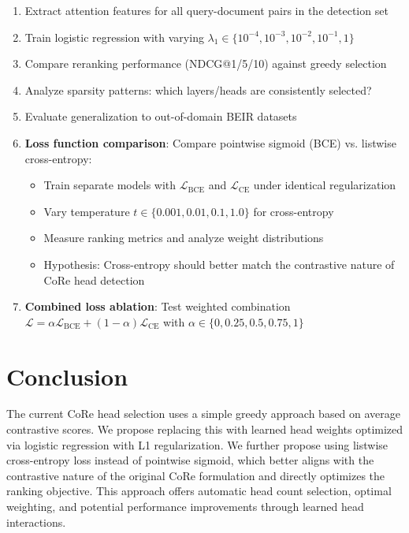 \documentclass[11pt,a4paper]{article}
\begin{document}
\begin{enumerate}
    \item Extract attention features for all query-document pairs in the detection set
    \item Train logistic regression with varying $\lambda_1 \in \{10^{-4}, 10^{-3}, 10^{-2}, 10^{-1}, 1\}$
    \item Compare reranking performance (NDCG@1/5/10) against greedy selection
    \item Analyze sparsity patterns: which layers/heads are consistently selected?
    \item Evaluate generalization to out-of-domain BEIR datasets
    \item \textbf{Loss function comparison}: Compare pointwise sigmoid (BCE) vs. listwise cross-entropy:
    \begin{itemize}
        \item Train separate models with $\mathcal{L}_{\text{BCE}}$ and $\mathcal{L}_{\text{CE}}$ under identical regularization
        \item Vary temperature $t \in \{0.001, 0.01, 0.1, 1.0\}$ for cross-entropy
        \item Measure ranking metrics and analyze weight distributions
        \item Hypothesis: Cross-entropy should better match the contrastive nature of CoRe head detection
    \end{itemize}
    \item \textbf{Combined loss ablation}: Test weighted combination $\mathcal{L} = \alpha \mathcal{L}_{\text{BCE}} + (1-\alpha) \mathcal{L}_{\text{CE}}$ with $\alpha \in \{0, 0.25, 0.5, 0.75, 1\}$
\end{enumerate}

\section{Conclusion}

The current CoRe head selection uses a simple greedy approach based on average contrastive scores. We propose replacing this with learned head weights optimized via logistic regression with L1 regularization. We further propose using listwise cross-entropy loss instead of pointwise sigmoid, which better aligns with the contrastive nature of the original CoRe formulation and directly optimizes the ranking objective. This approach offers automatic head count selection, optimal weighting, and potential performance improvements through learned head interactions.
\end{document}

